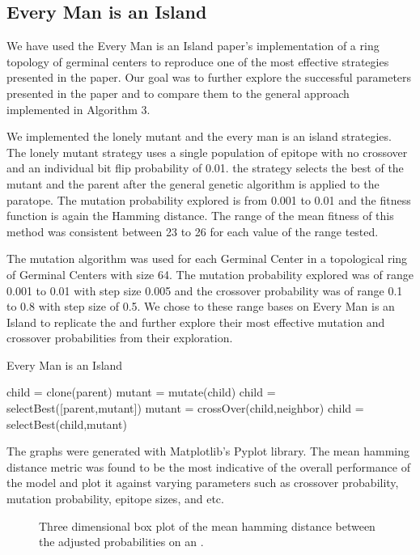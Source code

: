 \documentclass[conference]{IEEEtran}
\begin{document}
\subsection{Every Man is an Island}

We have used the Every Man is an Island \cite{b5} paper's implementation of a ring topology of germinal centers to reproduce one of the most effective strategies presented in the paper. Our goal was to further explore the successful parameters presented in the paper and to compare them to the general approach implemented in Algorithm 3.

We implemented the lonely mutant and the every man is an island strategies. The lonely mutant strategy uses a single population of epitope with no crossover and an individual bit flip probability of 0.01. the strategy selects the best of the mutant and the parent after the general genetic algorithm is applied to the paratope. The mutation probability explored is from 0.001 to 0.01 and the fitness function is again the Hamming distance. The range of the mean fitness of this method was consistent between 23 to 26 for each value of the range tested. 

The mutation algorithm was used for each Germinal Center in a topological ring of Germinal Centers with size 64. The mutation probability explored was of range 0.001 to 0.01 with step size 0.005 and the crossover probability was of range 0.1 to 0.8 with step size of 0.5. We chose to these range bases on Every Man is an Island to replicate the and further explore their most effective mutation and crossover probabilities from their exploration. 

\begin{algorithm}
\caption{Every Man is an Island}\label{alg:cap}

\State child = clone(parent)
\State mutant = mutate(child) 
\State child = selectBest([parent,mutant]) 
\State mutant = crossOver(child,neighbor) 
\State child = selectBest(child,mutant) 
\EndFor

\end{algorithm}

The graphs were generated with Matplotlib's Pyplot library. The mean hamming distance metric was found to be the most indicative of the overall performance of the model and plot it against varying parameters such as crossover probability, mutation probability, epitope sizes, and etc. 

\begin{figure}[htbp]
\caption{Three dimensional box plot of the mean hamming distance between the adjusted probabilities on an .}
\label{island}
\end{figure}
\end{document}
